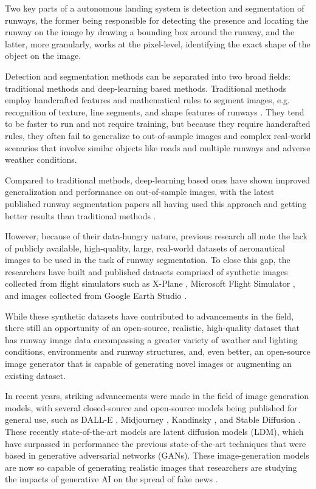 Two key parts of a autonomous landing system is detection and segmentation of runways, the former being responsible for detecting the presence and locating the runway on the image by drawing a bounding box around the runway, and the latter, more granularly, works at the pixel-level, identifying the exact shape of the object on the image.

Detection and segmentation methods can be separated into two broad fields: traditional methods and deep-learning based methods. Traditional methods employ handcrafted features and mathematical rules to segment images, e.g. recognition of texture, line segments, and shape features of runways \cite{aytekin_texture-based_2013} \cite{ye_research_2020}. They tend to be faster to run and not require training, but because they require handcrafted rules, they often fail to generalize to out-of-sample images and complex real-world scenarios that involve similar objects like roads and multiple runways and adverse weather conditions.

Compared to traditional methods, deep-learning based ones have shown improved generalization and performance on out-of-sample images, with the latest published runway segmentation papers all having used this approach and getting better results than traditional methods \cite{chen_image-based_2024} \cite{wang_valnet_2024}.

However, because of their data-hungry nature, previous research \cite{wang_valnet_2024} \cite{chen_image-based_2024} \cite{chen_bars_2023} \cite{ducoffe_lard_2023} all note the lack of publicly available, high-quality, large, real-world datasets of aeronautical images to be used in the task of runway segmentation. To close this gap, the researchers have built and published datasets comprised of synthetic images collected from flight simulators such as X-Plane \cite{chen_bars_2023} \cite{wang_valnet_2024}, Microsoft Flight Simulator \cite{chen_image-based_2024}, and images collected from Google Earth Studio \cite{ducoffe_lard_2023}.

While these synthetic datasets have contributed to advancements in the field, there still an opportunity of an open-source, realistic, high-quality dataset that has runway image data encompassing a greater variety of weather and lighting conditions, environments and runway structures, and, even better, an open-source image generator that is capable of generating novel images or augmenting an existing dataset.

In recent years, striking advancements were made in the field of image generation models, with several closed-source and open-source models being published for general use, such as DALL-E \cite{betker_improving_nodate}, Midjourney \cite{midjourney_midjourney_nodate}, Kandinsky \cite{arkhipkin_kandinsky_2024}, and Stable Diffusion \cite{rombach_high-resolution_2022}. These recently state-of-the-art models are latent diffusion models (LDM), which have surpassed in performance the previous state-of-the-art techniques that were based in generative adversarial networks (GANs). These image-generation models are now so capable of generating realistic images that researchers are studying the impacts of generative AI on the spread of fake news \cite{loth_blessing_2024}.

